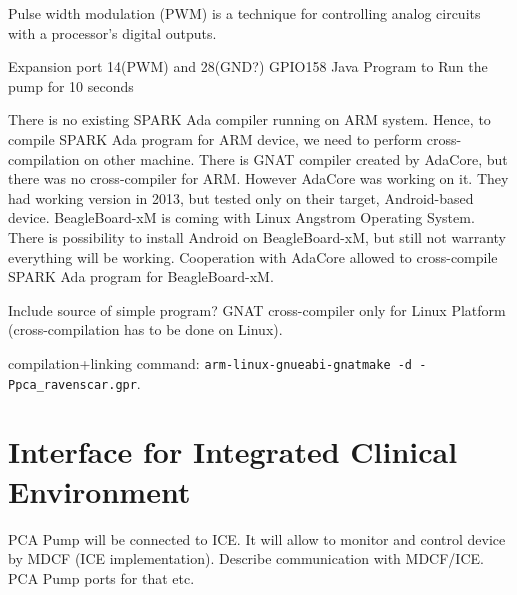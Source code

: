 Pulse width modulation (PWM) is a technique for controlling analog circuits with a processor's digital outputs.

Expansion port 14(PWM) and 28(GND?)
GPIO158
Java Program to Run the pump for 10 seconds

There is no existing SPARK Ada compiler running on ARM system. Hence, to compile SPARK Ada program for ARM device, we need to perform cross-compilation on other machine. There is GNAT compiler \cite{Horn:Thesis} created by AdaCore, but there was no cross-compiler for ARM. However AdaCore was working on it. They had working version in 2013, but tested only on their target, Android-based device. BeagleBoard-xM is coming with Linux Angstrom Operating System. There is possibility to install Android on BeagleBoard-xM, but still not warranty everything will be working. Cooperation with AdaCore allowed to cross-compile SPARK Ada program for BeagleBoard-xM.

Include source of simple program?
GNAT cross-compiler only for Linux Platform (cross-compilation has to be done on Linux).

compilation+linking command: \lstinline{arm-linux-gnueabi-gnatmake -d -Ppca_ravenscar.gpr}.




\section{Interface for Integrated Clinical Environment}
\label{pcapump:implementation:ice}

PCA Pump will be connected to ICE. It will allow to monitor and control device by MDCF (ICE implementation).
Describe communication with MDCF/ICE. PCA Pump ports for that etc.